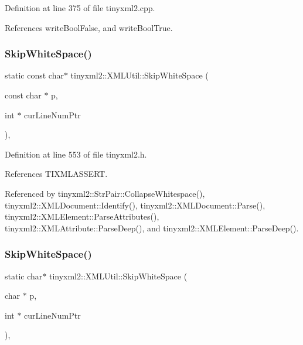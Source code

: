 Definition at line 375 of file tinyxml2.\+cpp.



References write\+Bool\+False, and write\+Bool\+True.

\mbox{\label{classtinyxml2_1_1_x_m_l_util_ab626a194b3523a5ba8b9dbaa2a165202}} 
\subsubsection{SkipWhiteSpace()\hspace{0.1cm}{\footnotesize\ttfamily [1/2]}}
{\footnotesize\ttfamily static const char$\ast$ tinyxml2\+::\+X\+M\+L\+Util\+::\+Skip\+White\+Space (\begin{DoxyParamCaption}\item[{const char $\ast$}]{p,  }\item[{int $\ast$}]{cur\+Line\+Num\+Ptr }\end{DoxyParamCaption})\hspace{0.3cm}{\ttfamily [inline]}, {\ttfamily [static]}}



Definition at line 553 of file tinyxml2.\+h.



References T\+I\+X\+M\+L\+A\+S\+S\+E\+RT.



Referenced by tinyxml2\+::\+Str\+Pair\+::\+Collapse\+Whitespace(), tinyxml2\+::\+X\+M\+L\+Document\+::\+Identify(), tinyxml2\+::\+X\+M\+L\+Document\+::\+Parse(), tinyxml2\+::\+X\+M\+L\+Element\+::\+Parse\+Attributes(), tinyxml2\+::\+X\+M\+L\+Attribute\+::\+Parse\+Deep(), and tinyxml2\+::\+X\+M\+L\+Element\+::\+Parse\+Deep().

\mbox{\label{classtinyxml2_1_1_x_m_l_util_abb6cb3e71f88efca82cb7157367fd91e}} 
\subsubsection{SkipWhiteSpace()\hspace{0.1cm}{\footnotesize\ttfamily [2/2]}}
{\footnotesize\ttfamily static char$\ast$ tinyxml2\+::\+X\+M\+L\+Util\+::\+Skip\+White\+Space (\begin{DoxyParamCaption}\item[{char $\ast$}]{p,  }\item[{int $\ast$}]{cur\+Line\+Num\+Ptr }\end{DoxyParamCaption})\hspace{0.3cm}{\ttfamily [inline]}, {\ttfamily [static]}}



